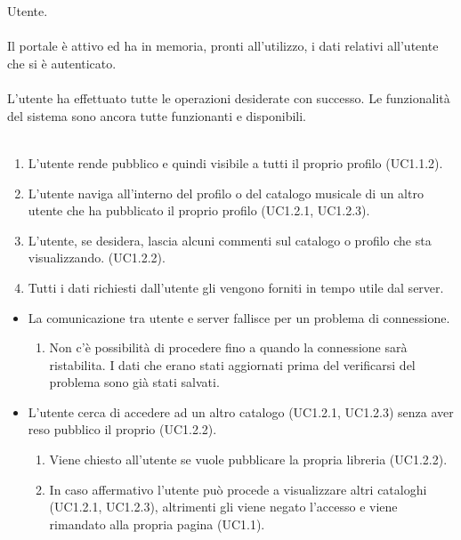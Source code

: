 \vspace*{0.5cm}
 \\\\
 Utente. \\\\
 Il portale \`e attivo ed ha in memoria, pronti all'utilizzo,
i dati relativi all'utente che si \`e autenticato.  \\\\
 L'utente ha effettuato tutte le operazioni desiderate
con successo. Le funzionalit\`a del sistema sono ancora tutte funzionanti e
disponibili. \\\\
\begin{enumerate}
  \item L'utente rende pubblico e quindi visibile a tutti il proprio profilo
  (UC1.1.2).
  \item L'utente naviga all'interno del profilo o del catalogo musicale di un
  altro utente che ha pubblicato il proprio profilo (UC1.2.1, UC1.2.3).
  \item L'utente, se desidera, lascia alcuni commenti sul catalogo o profilo che
  sta visualizzando. (UC1.2.2).
  \item Tutti i dati richiesti dall'utente gli vengono forniti in tempo utile
  dal server.
\end{enumerate}
\begin{itemize}
  \item La comunicazione tra utente e server fallisce per un problema di
  connessione.
  \begin {enumerate}
    \item Non c'\`e possibilit\`a di procedere fino a quando la connessione sar\`a
    ristabilita. I dati che erano stati aggiornati prima del verificarsi del
    problema sono gi\`a stati salvati.
  \end{enumerate}
  \item L'utente cerca di accedere ad un altro catalogo (UC1.2.1, UC1.2.3) senza aver reso
  pubblico il proprio (UC1.2.2).
  \begin {enumerate}
    \item Viene chiesto all'utente se vuole pubblicare la propria libreria
    (UC1.2.2).
    \item In caso affermativo l'utente pu\`o procede a visualizzare altri
    cataloghi (UC1.2.1, UC1.2.3), altrimenti gli viene negato l'accesso e viene rimandato alla
    propria pagina (UC1.1).
  \end{enumerate}
\end{itemize}
\newpage

